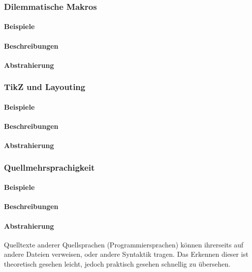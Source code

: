 \subsubsection{Dilemmatische Makros}\label{problems:special:macrodilemma}%
\paragraph*{Beispiele}
\paragraph*{Beschreibungen}
\paragraph*{Abstrahierung}

\subsubsection{TikZ und Layouting}\label{problems:advanced:layouting}
\paragraph*{Beispiele}
\paragraph*{Beschreibungen}
\paragraph*{Abstrahierung}

\subsubsection{Quellmehrsprachigkeit}\label{problems:special:sourcecode}
\paragraph*{Beispiele}
\paragraph*{Beschreibungen}
\paragraph*{Abstrahierung}
Quelltexte anderer Quellsprachen (Programmiersprachen) können ihrerseits auf andere Dateien verweisen, oder andere Syntaktik tragen. Das Erkennen dieser ist theoretisch gesehen leicht, jedoch praktisch gesehen schnellig zu übersehen. 









